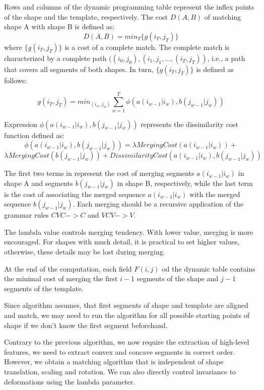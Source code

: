 Rows and columns of the dynamic programming table represent the inflex points of the shape and the template, respectively. The cost $D(A,B)$ of matching shape A with shape B is defined as:
\begin{equation*}
D(A,B) = min_{T} \{g(i_T,j_T)\}
\end{equation*}
where $\{g(i_T,j_T)\}$ is a cost of a complete match. The complete match is characterized by a complete path $((i_{0},j_{0}),(i_{1},j_{1}, ..., (i_{T},j_{T}))$, i.e., a path that covers all segments of both shapes. In turn, $\{g(i_T,j_T)\}$ is defined as follows:

\begin{equation*}
g(i_{T},j_{T}) = min_(i_w,j_w) \sum_{w=1}^{T} \phi(a(i_{w-1}|i_{w}), b(j_{w-1}|j_{w}))
\end{equation*}

Expression $\phi(a(i_{w-1}|i_{w}), b(j_{w-1}|j_{w}))$ represents the dissimilarity cost function defined as: 
\begin{equation*}
\phi(a(i_{w-1}|i_{w}), b(j_{w-1}|j_{w}))  =  \lambda MergingCost(a(i_{w-1}|i_{w}))  +
\end{equation*}
\begin{equation*} 
\lambda MergingCost(b(j_{w-1}|j_{w}))  +  DissimilarityCost(a(i_{w-1}|i_{w}), b(j_{w-1}|j_{w}))
\end{equation*}

The first two terms in represent the cost of merging segments $a(i_{w-1}|i_{w})$ in shape A and segments $b(j_{w-1}|j_{w})$ in shape B, respectively, while the last term is the cost of associating the merged sequence $a(i_{w-1}|i_{w})$ with the merged sequence $b(j_{w-1}|j_{w})$. Each merging should be a recursive application of the grammar rules  $CVC -> C$ and $VCV -> V$.

The lambda value controls merging tendency. With lower value, merging is more encouraged. For shapes with much detail, it is practical to set higher values, otherwise, these details may be lost during merging. 

At the end of the computation, each field $F(i,j)$ od the dynamic table contains the minimal cost of merging the first $i-1$ segments of the shape and $j-1$ segments of the template.

Since algorithm assumes, that first segments of shape and template are aligned and match, we may need to run the algorithm for all possible starting points of shape if we don't know the first segment beforehand.


Contrary to the previous algorithm, we now require the extraction of high-level features, we need to extract convex and concave segments in correct order. However, we obtain a matching algorithm that is independent of shape translation, scaling and rotation. We can also directly control invariance to deformations using the lambda parameter.


